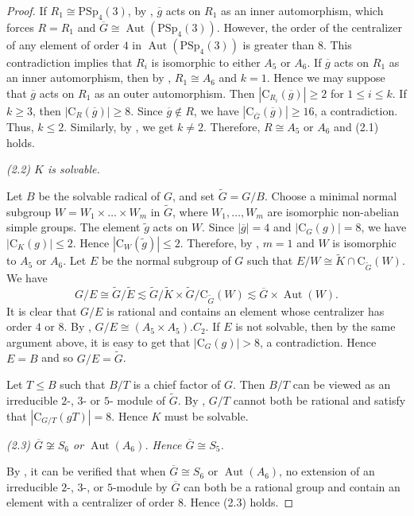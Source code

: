 \documentclass[11pt]{article}
\providecommand{\PSp}{{\mathrm{PSp}}}
\providecommand{\C}{{\mathrm{C}}}
\providecommand{\Aut}{{\operatorname{Aut}}}
\providecommand{\olg}{{\overline{g}}}
\providecommand{\olG}{{\overline{G}}}
\providecommand{\wtg}{{\widetilde{g}}}
\providecommand{\wtE}{{\widetilde{E}}}
\providecommand{\wtG}{{\widetilde{G}}}
\providecommand{\wtK}{{\widetilde{K}}}
\begin{document}
\begin{proof}
    If $R_1\cong \PSp_4(3)$, by \cite[Code 1]{Git},
    $\olg$ acts on $R_1$ as an inner automorphism,
    which forces $R=R_1$ and $\olG\cong \Aut(\PSp_4(3))$.
    However, the order of the centralizer of any element of order $4$ in $\Aut(\PSp_4(3))$ is greater than $8$.
    This contradiction implies that $R_i$ is isomorphic to either $A_5$ or $A_6$. 
    If $\olg$ acts on $R_1$ as an inner automorphism, 
    then by \cite[Code 1]{Git}, $R_1\cong A_6$ and $k=1$.
	    Hence we may suppose that $\olg$ acts on $R_1$ as an outer automorphism.
	    Then $|\C_{R_i}(\olg)|\geq 2$ for $1\leq i\leq k$.
    If $k\geq 3$, then $|\C_R(\olg)|\geq 8$.
	    Since $\olg \notin R$, we have $|\C_{\olG}(\olg)|\geq 16$, a contradiction.
    Thus, $k\leq 2$.
    Similarly, by \cite[Code 3, Code 7]{Git}, we get $k\neq 2$.
    Therefore, $R\cong A_5$ or $A_6$ and (2.1) holds.

\medskip
{\sl (2.2) $K$ is solvable. } 
    
    Let $B$ be the solvable radical of $G$, 
    and set $\wtG=G/B$. 
    Choose a minimal normal subgroup $W = W_1 \times \dots \times W_m$ in $\wtG$, 
    where $W_1, \dots, W_m$ are isomorphic non-abelian simple groups. 
    The element $\wtg$ acts on $W$. 
    Since $|\olg|=4$ and $|\C_G(g)|=8$, we have $|\C_{K}(g)|\leq 2$.
    Hence $|\C_W(\wtg)|\leq 2$.
    Therefore, by \cite[Code 1]{Git}, $m=1$ and $W$ is isomorphic to $A_5$ or $A_6$.
    Let $E$ be the normal subgroup of $G$ such that $E/W\cong \wtK\cap \C_{\wtG}(W)$.
    We have 
    $$G/E\cong \wtG/\wtE \lesssim \wtG/\wtK \times \wtG/\C_{\wtG}(W)
        \lesssim \olG \times \Aut(W).$$
    It is clear that $G/E$ is rational and contains an element whose centralizer has order $4$ or $8$.
    By \cite[Code 3, Code 7, Code 9]{Git}, $G/E\cong (A_5\times A_5).C_2$.
    If $E$ is not solvable, then by the same argument above, 
    it is easy to get that $|\C_G(g)|>8$, a contradiction.
    Hence $E=B$ and so $G/E=\wtG$.

    Let $T\leq B$ such that $B/T$ is a chief factor of $G$.
    Then $B/T$ can be viewed as an irreducible $2$-, $3$- or $5$- module of $\wtG$.
    By \cite[Code 10]{Git}, $G/T$ cannot both be rational and satisfy that $|\C_{G/T}(gT)|=8$.
    Hence $K$ must be solvable.

\medskip
{\sl (2.3) $ \olG \not\cong S_6$ or $\Aut(A_6)$. Hence $\olG\cong S_5$. } 

    By \cite[Code 11]{Git}, it can be verified that 
    when $\overline{G} \cong S_6$ or $\Aut(A_6)$, 
    no extension of an irreducible $2$-, $3$-, or $5$-module by $\overline{G}$
    can both be a rational group and contain an element with a centralizer of order $8$.
    Hence (2.3) holds.


\end{proof}
\end{document}
